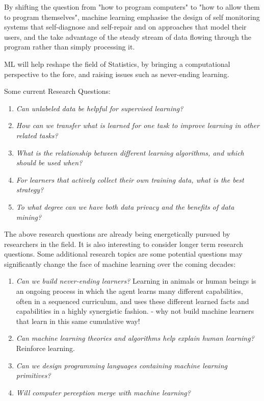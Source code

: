 \documentclass[twoside]{article}
\begin{document}
By shifting the question from "how to program computers" to "how to allow them to program themselves", machine learning emphasise the design of self monitoring systems that self-diagnose and self-repair and on approaches that model their users, and the take advantage of the steady stream of data flowing through the program rather than simply processing it.

ML will help reshape the field of Statistics, by bringing a computational perspective to the fore, and raising issues such as never-ending learning.

Some current Research Questions:
\begin{enumerate}
\item \textit{Can unlabeled data be helpful for supervised learning?}
\item \textit{How can we transfer what is learned for one task to improve learning in other related tasks?}
\item \textit{What is the relationship between different learning algorithms, and which should be used when?}
\item \textit{For learners that actively collect their own training data, what is the best strategy?}
\item \textit{To what degree can we have both data privacy and the benefits of data mining?}
\end{enumerate}

The above research questions are already being energetically pursued by researchers in the field. It is also interesting to consider longer term research questions. Some additional research topics are some potential questions may significantly change the face of machine learning over the coming decades:
\begin{enumerate}
\item \textit{Can we build never-ending learners?} Learning in animals or human beings is an ongoing process in which the agent learns many different capabilities, often in a sequenced curriculum, and uses these different learned facts and capabilities in a highly synergistic fashion. - why not build machine learners that learn in this same cumulative way!
\item \textit{Can machine learning theories and algorithms help explain human learning?} Reinforce learning.
\item \textit{Can we design programming languages containing machine learning primitives?}
\item \textit{Will computer perception merge with machine learning?}
\end{enumerate}
\end{document}
